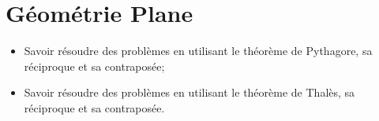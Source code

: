 \chapter{Géométrie Plane}

\begin{acquis}
\begin{itemize}
\item Savoir résoudre des problèmes en utilisant le théorème de Pythagore, sa réciproque et sa contraposée;
\item Savoir résoudre des problèmes en utilisant le théorème de Thalès, sa réciproque et sa contraposée.
\end{itemize}
\end{acquis}

\exercicesbase
\begin{colonne*exercice}

\end{colonne*exercice}

\connaissances


\pagebreak




